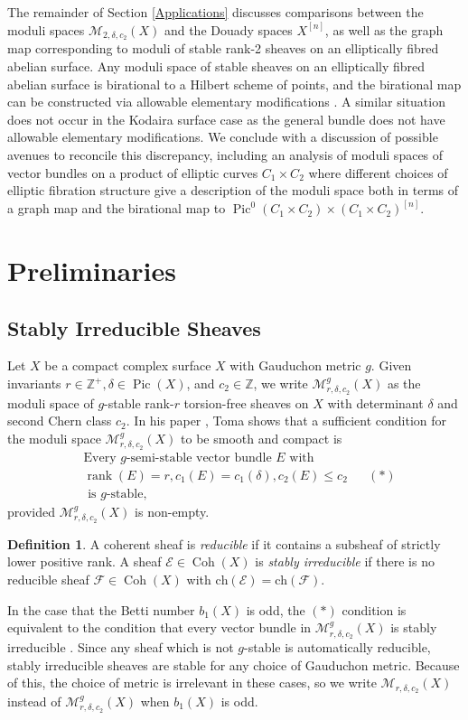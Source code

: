 \documentclass{article}[12pt]
\theoremstyle{definition}
\newtheorem{definition}[theorem]{Definition}
\theoremstyle{remark}
\newcommand \Z{\mathbb Z}
\numberwithin{equation}{section}
\newcommand \mc{\mathcal}
\DeclareMathOperator{\Pic}{Pic}
\DeclareMathOperator{\rank}{rank}
\DeclareMathOperator{\Coh}{Coh}
\begin{document}
  The remainder of Section \ref{Applications} discusses comparisons between the moduli spaces $\mc{M}_{2,\delta,c_2}(X)$ and the Douady spaces $X^{[n]}$, as well as the graph map corresponding to moduli of stable rank-2 sheaves on an elliptically fibred abelian surface. Any moduli space of stable sheaves on an elliptically fibred abelian surface is birational to a Hilbert scheme of points, and the birational map can be constructed via allowable elementary modifications \cite[Chapter 8]{Fried}. A similar situation does not occur in the Kodaira surface case as the general bundle does not have allowable elementary modifications. We conclude with a discussion of possible avenues to reconcile this discrepancy, including an analysis of moduli spaces of vector bundles on a product of elliptic curves $C_1\times C_2$  where different choices of elliptic fibration structure give a description of the moduli space both in terms of a graph map and the birational map to $\Pic^0(C_1\times C_2)\times (C_1\times C_2)^{[n]}$.

\section{Preliminaries}\label{Prelim}
\subsection{Stably Irreducible Sheaves}
Let $X$ be a compact complex surface $X$ with Gauduchon metric $g$. Given invariants $r \in \Z^+, \delta \in \Pic(X)$, and $c_2 \in \Z$, we write $\mc{M}^g_{r,\delta,c_2}(X)$ as the moduli space of $g$-stable rank-$r$ torsion-free sheaves on $X$ with determinant $\delta$ and second Chern class $c_2$. In his paper \cite{TomaCpt}, Toma shows that a sufficient condition for the moduli space $\mc{M}^g_{r,\delta,c_2}(X)$ to be smooth and compact is 
\begin{align*}&\text{Every }g\text{-semi-stable vector bundle } E \text{ with }\\ &\rank(E)=r,c_1(E)=c_1(\delta), c_2(E)\leq c_2&& (*)\\ &\text{ is }g\text{-stable,}\end{align*} 
provided $\mc{M}^g_{r,\delta,c_2}(X)$ is non-empty.
\begin{definition}
	A coherent sheaf is \emph{reducible} if it contains a subsheaf of strictly lower positive rank. A sheaf $\mc{E} \in \Coh(X)$ is \emph{stably irreducible} if there is no reducible sheaf $\mc{F}\in \Coh(X)$ with $\text{ch}(\mc{E})=\text{ch}(\mc{F})$.
\end{definition}
In the case that the Betti number $b_1(X)$ is odd, the $(*)$ condition is equivalent to the condition that every vector bundle in $\mc{M}^g_{r,\delta,c_2}(X)$ is stably irreducible \cite{TomaCpt}. Since any sheaf which is not $g$-stable is automatically reducible, stably irreducible sheaves are stable for any choice of Gauduchon metric. Because of this, the choice of metric is irrelevant in these cases, so we write $\mc{M}_{r,\delta,c_2}(X)$ instead of $\mc{M}^g_{r,\delta,c_2}(X)$ when $b_1(X)$ is odd.
\end{document}
